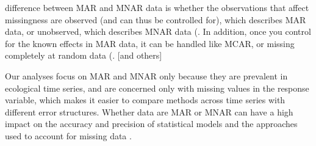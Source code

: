 \documentclass{article}
\begin{document}
\begin{linenumbers}
difference between MAR and MNAR data is whether the observations that affect missingness are observed (and can thus be controlled for), which describes MAR data, or unobserved, which describes MNAR data (\citep{nakagawa_model_2011}. In addition, once you control for the known effects in MAR data, it can be handled like MCAR, or missing completely at random data (\citep{nakagawa_missing_2015}.  [and others]

Our analyses focus on MAR and MNAR only because they are prevalent in ecological time series, and are concerned only with missing values in the response variable, which makes it easier to compare methods across time series with different error structures. Whether data are MAR or MNAR can have a high impact on the accuracy and precision of statistical models and the approaches used to account for missing data \citep{newman_missing_2014, dong2013principled}. 


\end{linenumbers}
\end{document}
